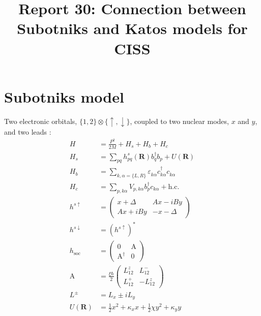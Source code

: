 \documentclass{article}
\renewcommand{\vec}[1]{\mathbf{#1}}
\newcommand{\pdagger}{{\phantom{\dagger}}}
\begin{document}
\title{Report 30: Connection between Subotniks and Katos models for CISS}
\maketitle
\section{Subotniks model}
Two electronic orbitals, $\{1,2\}\otimes \{\uparrow,\downarrow\}$, coupled to two nuclear modes, $x$ and $y$, and two leads \cite{teh2022spin,teh2021antisymmetric}:
\begin{align}
	H &= \frac{P^2}{2M} + H_s + H_b + H_c\\
	H_s &= \sum_{pq} h_{pq}^s(\vec{R}) b_q^\dagger b_p^\pdagger + U(\vec{R})\\
	H_b &= \sum_{k,\alpha=\{L,R\}} \varepsilon_{k\alpha}^\pdagger c_{k\alpha}^\dagger c_{k\alpha}^\pdagger\\
	H_c&= \sum_{p,k\alpha}V_{p,k\alpha}b_p^\dagger c_{k\alpha}+\mathrm{h.c.}\\
	h^{s\uparrow}&=\begin{pmatrix}
		x+\Delta & Ax-iBy\\
		Ax+iBy & -x-\Delta
	\end{pmatrix}\\
	h^{s\downarrow} &= (h^{s\uparrow})^*\\
	h_\mathrm{soc} &= \begin{pmatrix}
		0 & \mathrm{A}\\
		\mathrm{A}^\dagger & 0
	\end{pmatrix} \\
	\mathrm{A} &= \frac{\xi \hbar}{2}\begin{pmatrix}
		L_{12}^z & L^-_{12}\\
		L_{12}^+ & -L^z_{12}
	\end{pmatrix}\\
	L^\pm &= L_x \pm i L_y\\
	U(\vec{R})&= \frac{1}{2}x^2 + \kappa_x x + \frac{1}{2}\chi y^2 + \kappa_y y
\end{align}
\end{document}
